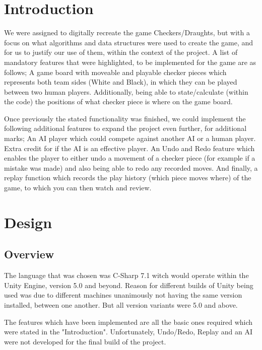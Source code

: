 \documentclass[10pt, a4paper]{article}
\title{\mytitle}
\author{\myauthor\hspace{1em}\\\contact\\Edinburgh Napier University\hspace{0.5em}-\hspace{0.5em}\mymodule}
\date{}
\begin{document}
    \maketitle
    
    \section{Introduction}
	We were assigned to digitally recreate the game Checkers/Draughts, but with a focus on what algorithms and data structures were used to create the game, and for us to justify our use of them, within the context of the project. A list of mandatory features that were highlighted, to be implemented for the game are as follows; A game board with moveable and playable checker pieces which represents both team sides (White and Black), in which they can be played between two human players. Additionally, being able to state/calculate (within the code) the positions of what checker piece is where on the game board.
	
	Once previously the stated functionality was finished, we could implement the following additional features to expand the project even further, for additional marks; An AI player which could compete against another AI or a human player. Extra credit for if the AI is an effective player. An Undo and Redo feature which enables the player to either undo a movement of a checker piece (for example if a mistake was made) and also being able to redo any recorded moves. And finally, a replay function which records the play history (which piece moves where) of the game, to which you can then watch and review.
	
	\section{Design}
	\subsection{Overview}
	The language that was chosen was C-Sharp 7.1 witch would operate within the Unity Engine, version 5.0 and beyond. Reason for different builds of Unity being used was due to different machines unanimously not having the same version installed, between one another. But all version variants were 5.0 and above.
	
	The features which have been implemented are all the basic ones required which were stated in the "Introduction". Unfortunately, Undo/Redo, Replay and an AI were not developed for the final build of the project.
	
\end{document}
